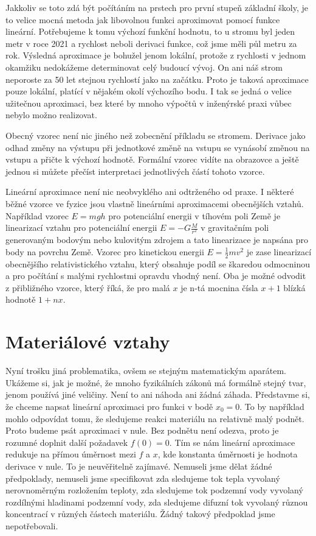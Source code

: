 \documentclass[12pt]{article}
\begin{document}
Jakkoliv se toto zdá být počítáním na prstech pro první stupeň základní školy, je to velice mocná metoda jak libovolnou funkci aproximovat pomocí funkce lineární. Potřebujeme k tomu výchozí funkční hodnotu, to u stromu byl jeden metr v roce 2021 a rychlost neboli derivaci funkce, což jsme měli půl metru za rok. Výsledná aproximace je bohužel jenom lokální, protože z rychlosti v jednom okamžiku nedokážeme determinovat celý budoucí vývoj. On ani náš strom neporoste za 50 let stejnou rychlostí jako na začátku. Proto je taková aproximace pouze lokální, platící v nějakém okolí výchozího bodu. I tak se jedná o velice užitečnou aproximaci, bez které by mnoho výpočtů v inženýrské praxi vůbec nebylo možno realizovat.

Obecný vzorec není nic jiného než zobecnění příkladu se stromem. Derivace jako odhad změny na výstupu při jednotkové změně na vstupu se vynásobí změnou na vstupu a přičte k výchozí hodnotě. Formální vzorec vidíte na obrazovce a ještě jednou si můžete přečíst interpretaci jednotlivých částí tohoto vzorce.

Lineární aproximace není nic neobvyklého ani odtrženého od praxe. I některé běžné vzorce ve fyzice jsou vlastně lineárními aproximacemi obecnějších vztahů. Například vzorec $E=mgh$ pro potenciální energii v tíhovém poli Země je linearizací vztahu pro potenciální energii $E=-G\frac{M}{r^2}$ v gravitačním poli generovaným bodovým nebo kulovitým zdrojem a tato linearizace je napsána pro body na povrchu Země. Vzorec pro kinetickou energii $E=\frac 12 mv^2$ je zase linearizací obecnějšího relativistického vztahu, který obsahuje podíl se škaredou odmocninou a pro počítání s malými rychlostmi opravdu vhodný není. Oba je možné odvodit z přibližného vzorce, který říká, že pro malá $x$ je n-tá mocnina čísla $x+1$ blízká hodnotě $1+nx.$

\section*{Materiálové vztahy}


Nyní trošku jiná problematika, ovšem se stejným matematickým aparátem. Ukážeme si, jak je možné, že mnoho fyzikálních zákonů má formálně stejný tvar, jenom používá jiné veličiny. Není to ani náhoda ani žádná záhada. Představme si, že chceme napsat lineární aproximaci pro funkci v bodě $x_0=0$. To by například mohlo odpovídat tomu, že sledujeme reakci materiálu na relativně malý podnět. Proto budeme psát aproximaci v nule. Bez podnětu není odezva, proto je rozumné doplnit další požadavek $f(0)=0$. Tím se nám lineární aproximace redukuje na přímou úměrnost mezi $f$ a $x$, kde konstanta úměrnosti je hodnota derivace v nule. To je neuvěřitelně zajímavé. Nemuseli jsme dělat žádné předpoklady, nemuseli jsme specifikovat zda sledujeme tok tepla vyvolaný nerovnoměrným rozložením teploty, zda sledujeme tok podzemní vody vyvolaný rozdílnými hladinami podzemní vody, zda sledujeme difuzní tok vyvolaný různou koncentrací v různých částech materiálu. Žádný takový předpoklad jsme nepotřebovali.
\end{document}
